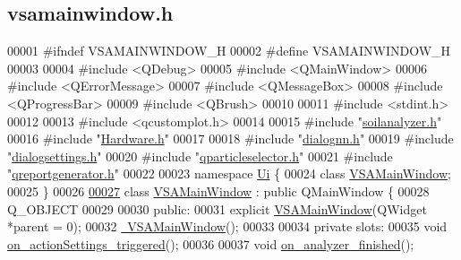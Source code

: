 \hypertarget{vsamainwindow_8h_source}{}\subsection{vsamainwindow.\+h}
\label{vsamainwindow_8h_source}

\begin{DoxyCode}
00001 \textcolor{preprocessor}{#ifndef VSAMAINWINDOW\_H}
00002 \textcolor{preprocessor}{#define VSAMAINWINDOW\_H}
00003 
00004 \textcolor{preprocessor}{#include <QDebug>}
00005 \textcolor{preprocessor}{#include <QMainWindow>}
00006 \textcolor{preprocessor}{#include <QErrorMessage>}
00007 \textcolor{preprocessor}{#include <QMessageBox>}
00008 \textcolor{preprocessor}{#include <QProgressBar>}
00009 \textcolor{preprocessor}{#include <QBrush>}
00010 
00011 \textcolor{preprocessor}{#include <stdint.h>}
00012 
00013 \textcolor{preprocessor}{#include <qcustomplot.h>}
00014 
00015 \textcolor{preprocessor}{#include "\hyperlink{soilanalyzer_8h}{soilanalyzer.h}"}
00016 \textcolor{preprocessor}{#include "\hyperlink{_hardware_8h}{Hardware.h}"}
00017 
00018 \textcolor{preprocessor}{#include "\hyperlink{dialognn_8h}{dialognn.h}"}
00019 \textcolor{preprocessor}{#include "\hyperlink{dialogsettings_8h}{dialogsettings.h}"}
00020 \textcolor{preprocessor}{#include "\hyperlink{qparticleselector_8h}{qparticleselector.h}"}
00021 \textcolor{preprocessor}{#include "\hyperlink{qreportgenerator_8h}{qreportgenerator.h}"}
00022 
00023 \textcolor{keyword}{namespace }\hyperlink{namespace_ui}{Ui} \{
00024 \textcolor{keyword}{class }\hyperlink{class_v_s_a_main_window}{VSAMainWindow};
00025 \}
00026 
\hypertarget{vsamainwindow_8h_source_l00027}{}\hyperlink{class_v_s_a_main_window}{00027} \textcolor{keyword}{class }\hyperlink{class_v_s_a_main_window}{VSAMainWindow} : \textcolor{keyword}{public} QMainWindow \{
00028   Q\_OBJECT
00029 
00030 \textcolor{keyword}{public}:
00031   \textcolor{keyword}{explicit} \hyperlink{class_v_s_a_main_window_a7fa18757c1fce5c8f41f25277f9e1a70}{VSAMainWindow}(QWidget *parent = 0);
00032   \hyperlink{class_v_s_a_main_window_ae796e5df1630b2c8ce6d92e84984c071}{~VSAMainWindow}();
00033 
00034 \textcolor{keyword}{private} slots:
00035   \textcolor{keywordtype}{void} \hyperlink{class_v_s_a_main_window_a5f8da8de2112e083b8bf1851a7fb123c}{on\_actionSettings\_triggered}();
00036 
00037   \textcolor{keywordtype}{void} \hyperlink{class_v_s_a_main_window_a33a4896e2b25348d5e1344e4b37bbd33}{on\_analyzer\_finished}();

\end{DoxyCode}
